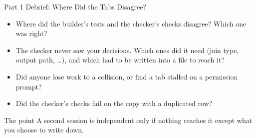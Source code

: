 \begin{frame}{Part 1 Debrief: Where Did the Tabs Disagree?}
  \begin{itemize}
    \item Where did the builder's tests and the checker's checks disagree? Which one was right?
    \item The checker never saw your decisions. Which ones did it need (join type, output path, \ldots), and which had to be written into a file to reach it?
    \item Did anyone lose work to a collision, or find a tab stalled on a permission prompt?
    \item Did the checker's checks fail on the copy with a duplicated row?
  \end{itemize}

  \vspace{0.8em}
  \begin{block}{The point}
    A second session is independent only if nothing reaches it except what you choose to write down.
  \end{block}
\end{frame}
